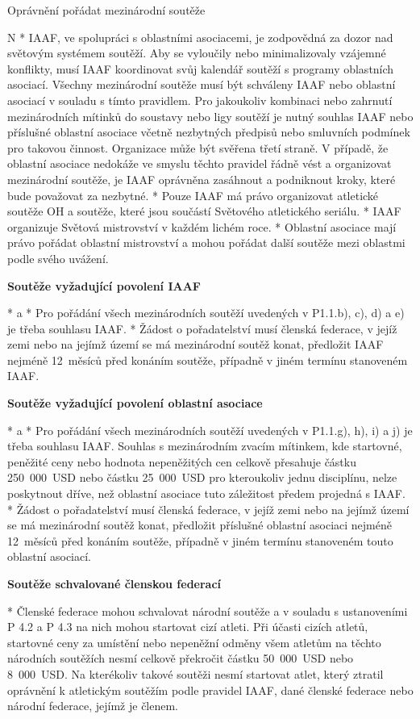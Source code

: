 \secc Oprávnění pořádat mezinárodní soutěže

\begitems \style N
* IAAF, ve spolupráci s oblastními asociacemi, je zodpovědná za dozor nad světovým systémem soutěží. Aby se vyloučily nebo minimalizovaly vzájemné konflikty, musí IAAF koordinovat svůj kalendář soutěží s programy oblastních asociací. Všechny mezinárodní soutěže musí být schváleny IAAF nebo oblastní asociací v souladu s tímto pravidlem. Pro jakoukoliv kombinaci nebo zahrnutí mezinárodních mítinků do soustavy nebo ligy soutěží je nutný souhlas IAAF nebo příslušné oblastní asociace včetně nezbytných předpisů nebo smluvních podmínek pro takovou činnost. Organizace může být svěřena třetí straně. V případě, že oblastní asociace nedokáže ve smyslu těchto pravidel řádně vést a organizovat mezinárodní soutěže, je IAAF oprávněna zasáhnout a podniknout kroky, které bude považovat za nezbytné.
* Pouze IAAF má právo organizovat atletické soutěže OH a soutěže, které jsou součástí Světového atletického seriálu.
* IAAF organizuje Světová mistrovství v každém lichém roce.
* Oblastní asociace mají právo pořádat oblastní mistrovství a mohou pořádat další soutěže mezi oblastmi podle svého uvážení.

{\bf Soutěže vyžadující povolení IAAF}

* \begitems \style a
  * Pro pořádání všech mezinárodních soutěží uvedených v P1.1.b), c), d) a e) je třeba souhlasu IAAF.
  * Žádost o pořadatelství musí členská federace, v jejíž zemi nebo na jejímž území se má mezinárodní soutěž konat, předložit IAAF nejméně 12~měsíců před konáním soutěže, případně v jiném termínu stanoveném IAAF.
  \enditems

{\bf Soutěže vyžadující povolení oblastní asociace}

* \begitems \style a
  * Pro pořádání všech mezinárodních soutěží uvedených v P1.1.g), h), i) a j) je třeba souhlasu IAAF. Souhlas s mezinárodním zvacím mítinkem, kde startovné, peněžité ceny nebo hodnota nepeněžitých cen celkově přesahuje částku 250~000~USD nebo částku 25~000~USD pro kteroukoliv jednu disciplínu, nelze poskytnout dříve, než oblastní asociace tuto záležitost předem projedná s IAAF.
  * Žádost o pořadatelství musí členská federace, v jejíž zemi nebo na jejímž území se má mezinárodní soutěž konat, předložit příslušné oblastní asociaci nejméně 12~měsíců před konáním soutěže, případně v jiném termínu stanoveném touto oblastní asociací.
  \enditems

{\bf Soutěže schvalované členskou federací}

* Členské federace mohou schvalovat národní soutěže a v souladu s ustanoveními P 4.2 a P 4.3 na nich mohou startovat cizí atleti. Při účasti cizích atletů, startovné ceny za umístění nebo nepeněžní odměny všem atletům na těchto národních soutěžích nesmí celkově překročit částku 50~000~USD nebo 8~000~USD. Na kterékoliv takové soutěži nesmí startovat atlet, který ztratil oprávnění k atletickým soutěžím podle pravidel IAAF, dané členské federace nebo národní federace, jejímž je členem.
\enditems

